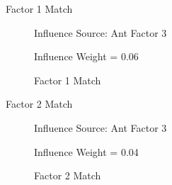 \documentclass{beamer}
\begin{document}
\begin{frame}{Factor 1 Match}
\begin{figure}%
    \centering
    \qquad
    \caption{Factor 1 Match}%
    \label{fig:com1}%
    Influence Source: Ant Factor 3 
    \par Influence Weight = 0.06
\end{figure}

\end{frame}

\begin{frame}{Factor 2 Match}
\begin{figure}%
    \centering
    \qquad
    \caption{Factor 2 Match}%
    \label{fig:com2}%
    Influence Source: Ant Factor 3 
    \par Influence Weight = 0.04
\end{figure}
\end{frame}
\end{document}
